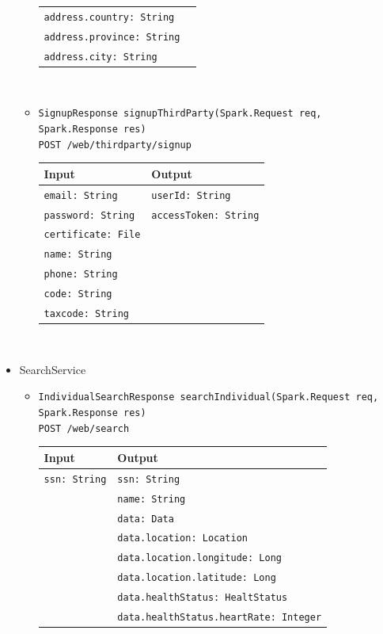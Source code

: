 \documentclass[a4paper, hidelinks, 12pt]{report}
\begin{document}
\begin{itemize}
\begin{itemize}
\begin{tabular}{l | l}
				\verb|address.country: String| & \\
				\verb|address.province: String| & \\
				\verb|address.city: String| & \\
			\end{tabular}\\
			\item{\verb|SignupResponse signupThirdParty(Spark.Request req, Spark.Response res)|\\ \verb|POST /web/thirdparty/signup|}\\
			\begin{tabular}{l | l}
			\textbf{Input} & \textbf{Output} \\
			\hline
				\verb|email: String| & \verb|userId: String| \\
				\verb|password: String| & \verb|accessToken: String| \\
				\verb|certificate: File| & \\
				\verb|name: String| & \\
				\verb|phone: String| & \\
				\verb|code: String| & \\
				\verb|taxcode: String| & \\
			\end{tabular}\\
		\end{itemize}
		\item{SearchService}
		\begin{itemize}
			\item{\verb|IndividualSearchResponse searchIndividual(Spark.Request req,|\\ \verb|Spark.Response res)|\\ \verb|POST /web/search|}\\
			\begin{tabular}{l | l}
			\textbf{Input} & \textbf{Output} \\
			\hline
				\verb|ssn: String| & \verb|ssn: String| \\
				& \verb|name: String| \\
				& \verb|data: Data| \\
				& \verb|data.location: Location| \\
				& \verb|data.location.longitude: Long| \\
				& \verb|data.location.latitude: Long| \\
				& \verb|data.healthStatus: HealtStatus| \\
				& \verb|data.healthStatus.heartRate: Integer| \\

\end{tabular}
\end{itemize}
\end{itemize}
\end{document}
